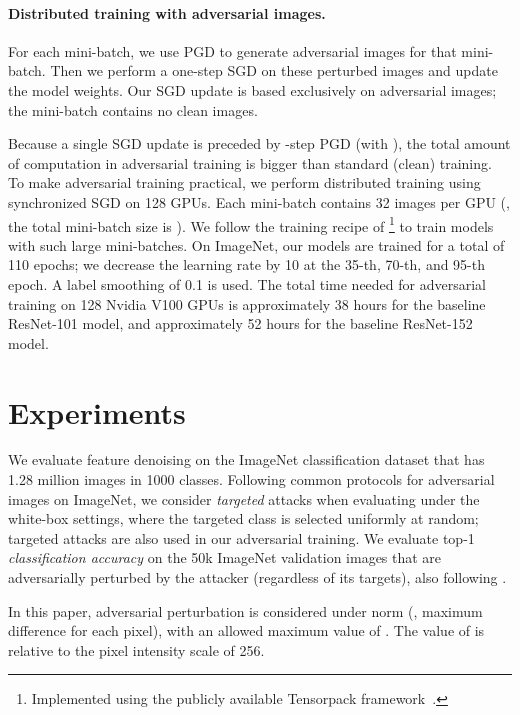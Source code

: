 \documentclass[10pt,twocolumn,letterpaper]{article}
\begin{document}
\paragraph{Distributed training with adversarial images.} For each mini-batch, we use PGD to generate adversarial images for that mini-batch. Then we perform a one-step SGD on these perturbed images and update the model weights. Our SGD update is based exclusively on adversarial images; the mini-batch contains no clean images.

Because a single SGD update is preceded by -step PGD (with ), the total amount of computation in adversarial training is  bigger than standard (clean) training. To make adversarial training practical, we perform distributed training using synchronized SGD on 128 GPUs. Each mini-batch contains 32 images per GPU (\ie, the total mini-batch size is ). We follow the training recipe of \cite{Goyal2017}\footnote{Implemented using the publicly available Tensorpack framework~\cite{Wu2016}.} to train models with such large mini-batches. 
On ImageNet, our models are trained for a total of 110 epochs; we decrease the learning rate by 10 at the 35-th, 70-th, and 95-th epoch. A label smoothing \cite{Szegedy2016a} of 0.1 is used.
The total time needed for adversarial training on 128 Nvidia V100 GPUs is  approximately 38 hours for the baseline ResNet-101 model, and approximately 52 hours for the baseline ResNet-152 model.

\section{Experiments}\label{sec:experiments}

We evaluate feature denoising on the ImageNet classification dataset \cite{Russakovsky2015} that has 1.28 million images in 1000 classes. Following common protocols \cite{Athalye2018,Kannan2018} for adversarial images on ImageNet, we consider \emph{targeted} attacks when evaluating under the white-box settings, where the targeted class is selected uniformly at random; 
targeted attacks are also used in our adversarial training.
We evaluate top-1 \emph{classification accuracy} on the 50k ImageNet validation images that are adversarially perturbed by the attacker (regardless of its targets), also following \cite{Athalye2018,Kannan2018}.

In this paper, adversarial perturbation is considered under  norm (\ie, maximum difference for each pixel), with an allowed maximum value of . The value of  is relative to the pixel intensity scale of 256.
\end{document}
